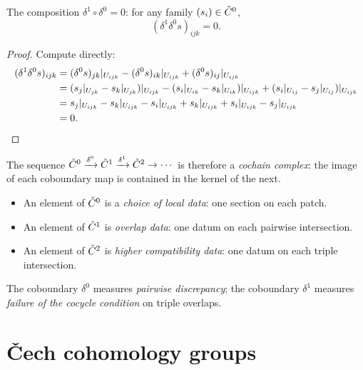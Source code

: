 \begin{proposition}[$\delta^1 \circ \delta^0 = 0$]
\label{prop:delta-squared-zero}
The composition $\delta^1 \circ \delta^0 = 0$: for any family
$(s_i) \in \check{C}^0$,
\[
  (\delta^1 \delta^0 s)_{ijk} = 0.
\]
\end{proposition}

\begin{proof}
Compute directly:
\begin{align*}
  (\delta^1 \delta^0 s)_{ijk}
  &= (\delta^0 s)_{jk}|_{U_{ijk}}
   - (\delta^0 s)_{ik}|_{U_{ijk}}
   + (\delta^0 s)_{ij}|_{U_{ijk}} \\
  &= (s_j|_{U_{jk}} - s_k|_{U_{jk}})|_{U_{ijk}}
   - (s_i|_{U_{ik}} - s_k|_{U_{ik}})|_{U_{ijk}}
   + (s_i|_{U_{ij}} - s_j|_{U_{ij}})|_{U_{ijk}} \\
  &= s_j|_{U_{ijk}} - s_k|_{U_{ijk}}
   - s_i|_{U_{ijk}} + s_k|_{U_{ijk}}
   + s_i|_{U_{ijk}} - s_j|_{U_{ijk}} \\
  &= 0. \qedhere
\end{align*}
\end{proof}

The sequence $\check{C}^0 \xrightarrow{\delta^0} \check{C}^1 \xrightarrow{\delta^1} \check{C}^2 \to \cdots$
is therefore a \emph{cochain complex}: the image of each coboundary
map is contained in the kernel of the next.

\begin{remark}
\label{rem:cech-degrees}
\begin{itemize}
\item An element of $\check{C}^0$ is a \emph{choice of local data}:
  one section on each patch.
\item An element of $\check{C}^1$ is \emph{overlap data}: one datum on
  each pairwise intersection.
\item An element of $\check{C}^2$ is \emph{higher compatibility data}:
  one datum on each triple intersection.
\end{itemize}
The coboundary $\delta^0$ measures \emph{pairwise discrepancy}; the
coboundary $\delta^1$ measures \emph{failure of the cocycle condition}
on triple overlaps.
\end{remark}



\section{\v{C}ech cohomology groups}
\label{sec:cech:cohomology}

